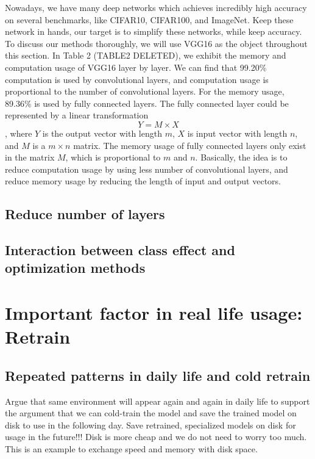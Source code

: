 \documentclass{article}
\begin{document}
Nowadays, we have many deep networks which achieves incredibly high accuracy on several benchmarks, like CIFAR10, CIFAR100, and ImageNet. Keep these network in hands, our target is to simplify these networks, while keep accuracy. To discuss our methods thoroughly, we will use VGG16 \cite{simonyan2014very} as the object throughout this section.
In Table 2 (TABLE2 DELETED), we exhibit the memory and computation usage of VGG16 layer by layer. We can find that 99.20\% computation is used by convolutional layers, and computation usage is proportional to the number of convolutional layers. For the memory usage, 89.36\% is used by fully connected layers. The fully connected layer could be represented by a linear transformation
\begin{equation}
Y = M \times X    
\end{equation}
, where $Y$ is the output vector with length $m$, $X$ is input vector with length $n$, and $M$ is a $m \times n$ matrix. The memory usage of fully connected layers only exist in the matrix $M$, which is proportional to $m$ and $n$. Basically, the idea is to reduce computation usage by using less number of convolutional layers, and reduce memory usage by reducing the length of input and output vectors.


\subsection{Reduce number of layers}


\subsection{Interaction between class effect and optimization methods}

\section{Important factor in real life usage: Retrain}

\subsection{Repeated patterns in daily life and cold retrain}
Argue that same environment will appear again and again in daily life to support the argument that we can cold-train the model and save the trained model on disk to use in the following day. Save retrained, specialized models on disk for usage in the future!!! Disk is more cheap and we do not need to worry too much. This is an example to exchange speed and memory with disk space.
\end{document}
